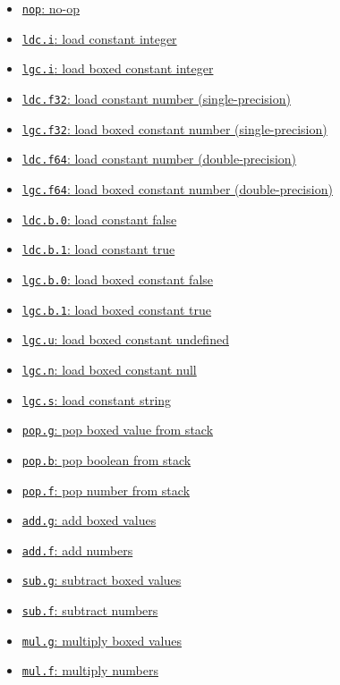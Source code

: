 \documentclass[11pt]{article}
\begin{document}
\begin{itemize}
\begin{itemize}
\begin{itemize}
\item \hyperref[sec:orgbc7ec8d]{\texttt{nop}: no-op}
\item \hyperref[sec:orgc756866]{\texttt{ldc.i}: load constant integer}
\item \hyperref[sec:org5cf9345]{\texttt{lgc.i}: load boxed
constant integer}
\item \hyperref[sec:orgd3689f6]{\texttt{ldc.f32}: load
constant number (single-precision)}
\item \hyperref[sec:orgee247e4]{\texttt{lgc.f32}:
load boxed constant number (single-precision)}
\item \hyperref[sec:org6bba761]{\texttt{ldc.f64}: load
constant number (double-precision)}
\item \hyperref[sec:orgae88789]{\texttt{lgc.f64}:
load boxed constant number (double-precision)}
\item \hyperref[sec:org628c82c]{\texttt{ldc.b.0}: load constant false}
\item \hyperref[sec:org45a4edf]{\texttt{ldc.b.1}: load constant true}
\item \hyperref[sec:orgdf93d05]{\texttt{lgc.b.0}: load boxed
constant false}
\item \hyperref[sec:org79cc95f]{\texttt{lgc.b.1}: load boxed
constant true}
\item \hyperref[sec:org5d44e29]{\texttt{lgc.u}: load boxed
constant undefined}
\item \hyperref[sec:org1969f37]{\texttt{lgc.n}: load boxed constant
null}
\item \hyperref[sec:org2f69311]{\texttt{lgc.s}: load constant string}
\item \hyperref[sec:org5cb332a]{\texttt{pop.g}: pop boxed value
from stack}
\item \hyperref[sec:org55a65aa]{\texttt{pop.b}: pop boolean from
stack}
\item \hyperref[sec:orgf652769]{\texttt{pop.f}: pop number from stack}
\item \hyperref[sec:orgd3666a0]{\texttt{add.g}: add boxed values}
\item \hyperref[sec:org117c408]{\texttt{add.f}: add numbers}
\item \hyperref[sec:org379b868]{\texttt{sub.g}: subtract boxed values}
\item \hyperref[sec:org371fd15]{\texttt{sub.f}: subtract numbers}
\item \hyperref[sec:org742c65a]{\texttt{mul.g}: multiply boxed values}
\item \hyperref[sec:org29a8cb0]{\texttt{mul.f}: multiply numbers}

\end{itemize}
\end{itemize}
\end{itemize}
\end{document}
